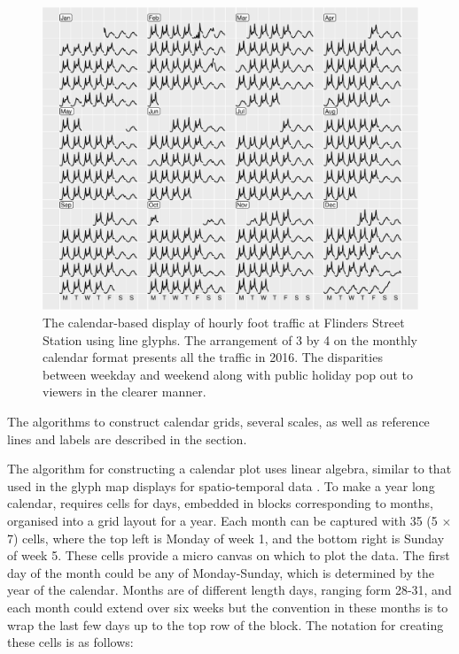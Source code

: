 \documentclass[article]{jss}
\begin{document}
\begin{CodeChunk}
\begin{figure}

{\centering \includegraphics[width=\textwidth]{figure/flinders-2016-1} 

}

\caption[The calendar-based display of hourly foot traffic at Flinders Street Station using line glyphs]{The calendar-based display of hourly foot traffic at Flinders Street Station using line glyphs. The arrangement of 3 by 4 on the monthly calendar format presents all the traffic in 2016. The disparities between weekday and weekend along with public holiday pop out to viewers in the clearer manner.}\label{fig:flinders-2016}
\end{figure}
\end{CodeChunk}

The algorithms to construct calendar grids, several scales, as well as
reference lines and labels are described in the section.

The algorithm for constructing a calendar plot uses linear algebra,
similar to that used in the glyph map displays for spatio-temporal data
\citep{Wickham2012glyph}. To make a year long calendar, requires cells
for days, embedded in blocks corresponding to months, organised into a
grid layout for a year. Each month can be captured with 35 (5 \(\times\)
7) cells, where the top left is Monday of week 1, and the bottom right
is Sunday of week 5. These cells provide a micro canvas on which to plot
the data. The first day of the month could be any of Monday-Sunday,
which is determined by the year of the calendar. Months are of different
length days, ranging form 28-31, and each month could extend over six
weeks but the convention in these months is to wrap the last few days up
to the top row of the block. The notation for creating these cells is as
follows:
\end{document}
